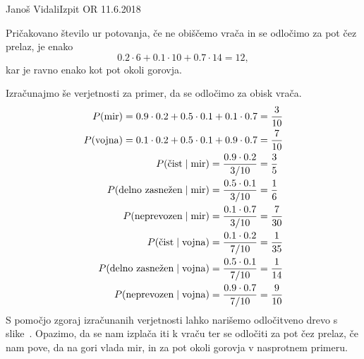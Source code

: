 \begin{naloga}{Janoš Vidali}{Izpit OR 11.6.2018}
\begin{odgovor}
Pričakovano število ur potovanja,
če ne obiščemo vrača in se odločimo za pot čez prelaz,
je enako
$$
0.2 \cdot 6 + 0.1 \cdot 10 + 0.7 \cdot 14 = 12 ,
$$
kar je ravno enako kot pot okoli gorovja.

Izračunajmo še verjetnosti za primer, da se odločimo za obisk vrača.
\begin{align*}
P(\text{mir}) = 0.9 \cdot 0.2 + 0.5 \cdot 0.1 + 0.1 \cdot 0.7
&= {3 \over 10} \\
P(\text{vojna}) = 0.1 \cdot 0.2 + 0.5 \cdot 0.1 + 0.9 \cdot 0.7
&= {7 \over 10} \\
P(\text{čist} \mid \text{mir}) = {0.9 \cdot 0.2 \over 3/10} &= {3 \over 5} \\
P(\text{delno zasnežen} \mid \text{mir}) = {0.5 \cdot 0.1 \over 3/10}
&= {1 \over 6} \\
P(\text{neprevozen} \mid \text{mir}) = {0.1 \cdot 0.7 \over 3/10}
&= {7 \over 30} \\
P(\text{čist} \mid \text{vojna}) = {0.1 \cdot 0.2 \over 7/10}
&= {1 \over 35} \\
P(\text{delno zasnežen} \mid \text{vojna}) = {0.5 \cdot 0.1 \over 7/10}
&= {1 \over 14} \\
P(\text{neprevozen} \mid \text{vojna}) = {0.9 \cdot 0.7 \over 7/10}
&= {9 \over 10}
\end{align*}
S pomočjo zgoraj izračunanih verjetnosti
lahko narišemo odločitveno drevo s slike~.
Opazimo,
da se nam izplača iti k vraču ter se odločiti za pot čez prelaz,
če nam pove, da na gori vlada mir,
in za pot okoli gorovja v nasprotnem primeru.
%
\begin{slika}
\end{slika}
\end{odgovor}
\end{naloga}
